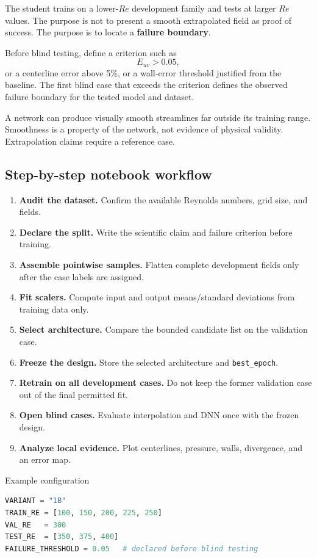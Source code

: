\documentclass[11pt]{article}
\begin{document}
The student trains on a lower-$Re$ development family and tests at larger $Re$ values. The purpose is not to present a smooth extrapolated field as proof of success. The purpose is to locate a \textbf{failure boundary}.

Before blind testing, define a criterion such as
\[
E_{uv}>0.05,
\]
or a centerline error above 5\%, or a wall-error threshold justified from the baseline. The first blind case that exceeds the criterion defines the observed failure boundary for the tested model and dataset.

\begin{warningbox}
A network can produce visually smooth streamlines far outside its training range. Smoothness is a property of the network, not evidence of physical validity. Extrapolation claims require a reference case.
\end{warningbox}

\subsection{Step-by-step notebook workflow}
\begin{enumerate}
\item \textbf{Audit the dataset.} Confirm the available Reynolds numbers, grid size, and fields.
\item \textbf{Declare the split.} Write the scientific claim and failure criterion before training.
\item \textbf{Assemble pointwise samples.} Flatten complete development fields only after the case labels are assigned.
\item \textbf{Fit scalers.} Compute input and output means/standard deviations from training data only.
\item \textbf{Select architecture.} Compare the bounded candidate list on the validation case.
\item \textbf{Freeze the design.} Store the selected architecture and \texttt{best\_epoch}.
\item \textbf{Retrain on all development cases.} Do not keep the former validation case out of the final permitted fit.
\item \textbf{Open blind cases.} Evaluate interpolation and DNN once with the frozen design.
\item \textbf{Analyze local evidence.} Plot centerlines, pressure, walls, divergence, and an error map.
\end{enumerate}

\begin{codeguide}{Example configuration}
\begin{lstlisting}[language=Python]
VARIANT = "1B"
TRAIN_RE = [100, 150, 200, 225, 250]
VAL_RE   = 300
TEST_RE  = [350, 375, 400]
FAILURE_THRESHOLD = 0.05   # declared before blind testing
\end{lstlisting}
\end{codeguide}
\end{document}
